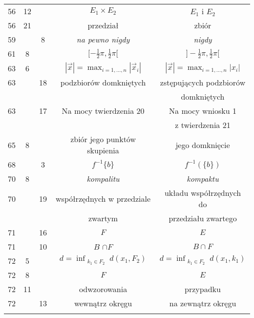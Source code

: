 \documentclass[a4paper]{article}
\newcommand{\fr}{\frac}
\newcommand{\ti}{\times}
\begin{document}
\begin{center}
\begin{tabular}{|c|c|c|c|c|}
    56 & 12 & & $E_{ 1 } \ti E_{ 2 }$ & $E_{ 1 }$ i $E_{ 2 }$ \\
    56 & 21 & & przedział & zbiór \\
    59 & & 8 & \emph{na pewno nigdy} & \emph{nigdy} \\
    61 & 8 & & $[ -\fr{ 1 }{ 2 } \pi, \fr{ 1 }{ 2 } \pi [$
           & $] -\fr{ 1 }{ 2 } \pi, \fr{ 1 }{ 2 } \pi [$ \\
    63 & 6 & & $| \vec{ x } | = \max_{ i = 1, \ldots, n}
               | \vec{ x }_{ i } |$
           & $| \vec{ x } | = \max_{ i = 1, \ldots, n} | x_{ i } |$ \\
    63 & & 18 & podzbiorów domkniętych & zstępujących podzbiorów \\
    & & & & domkniętych \\
    63 & & 17 & Na mocy twierdzenia 20 & Na mocy wniosku 1 \\
    & & & & z twierdzenia 21 \\
    65 & 8 & & zbiór jego punktów skupienia & jego domknięcie \\
    68 & & 3 & $f^{ -1 } \{ b \}$ & $f^{ -1 }( \{ b \} )$ \\
    70 & 8 & & \emph{kompalitu} & \emph{kompaktu} \\
    70 & & 19 & współrzędnych w przedziale & układu współrzędnych do \\
    & & & zwartym & przedziału zwartego \\
    71 & & 16 & $F$ & $E$ \\
    71 & & 10 & $B$ $\cap F$ & $B \cap F$ \\
    72 & 5 & & $d = \inf_{ \substack{ k_{ 1 } \in F_{ 2 } } } d( x_{ 1 },
               F_{ 2 } )$ 
           & $d = \inf_{ \substack{ k_{ 1 } \in F_{ 2 } } } 
             d( x_{ 1 }, k_{ 1 } )$ \\
    72 & 8 & & $F$ & $E$ \\
    72 & 11 & & odwzorowania & przypadku \\
    72 & & 13 & wewnątrz okręgu & na zewnątrz okręgu \\
    & & & & \\ \hline
  \end{tabular}


\end{center}
\end{document}
